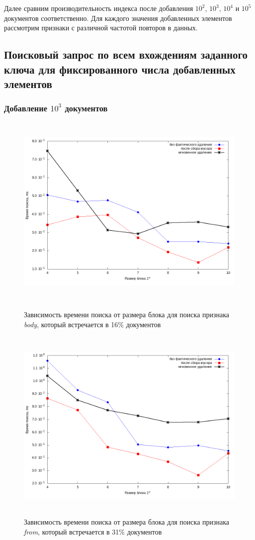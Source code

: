 Далее сравним производительность индекса после добавления $10^2$, $10^3$, $10^4$ и $10^5$
документов соответственно. Для каждого значения добавленных элементов рассмотрим
признаки с различной частотой повторов в данных.\nopagebreak[4]

\subsection{Поисковый запрос по всем вхождениям заданного ключа для фиксированного числа добавленных элементов}

\subsubsection{Добавление $10^3$ документов}

\begin{figure}[H]
\includegraphics[width=\linewidth, height=9.5cm]{fig/limit_1e6/1e3/body.png}
\caption{Зависимость времени поиска от размера блока для поиска признака \textit{body}, который встречается в 16\% документов}
\includegraphics[width=\linewidth, height=9.5cm]{fig/limit_1e6/1e3/from.png}
\caption{Зависимость времени поиска от размера блока для поиска признака \textit{from}, который встречается в 31\% документов}
\end{figure}

